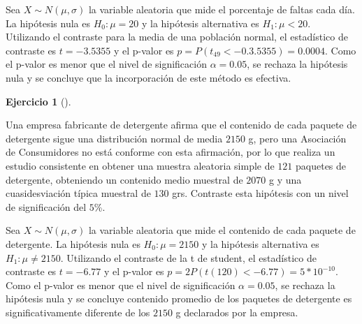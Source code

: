 \documentclass[
  spanish,
  a4paper,
]{scrreport}
\theoremstyle{definition}
\newtheorem{exercise}{Ejercicio}[chapter]
\theoremstyle{remark}
\begin{document}
\begin{tcolorbox}[enhanced jigsaw, arc=.35mm, bottomrule=.15mm, bottomtitle=1mm, breakable, colback=white, colbacktitle=quarto-callout-tip-color!10!white, colframe=quarto-callout-tip-color-frame, coltitle=black, left=2mm, leftrule=.75mm, opacityback=0, opacitybacktitle=0.6, rightrule=.15mm, title=\textcolor{quarto-callout-tip-color}{\faLightbulb}\hspace{0.5em}{Solución}, titlerule=0mm, toprule=.15mm, toptitle=1mm]

Sea \(X\sim N(\mu,\sigma)\) la variable aleatoria que mide el porcentaje
de faltas cada día. La hipótesis nula es \(H_0: \mu=20\) y la hipótesis
alternativa es \(H_1: \mu<20\). Utilizando el contraste para la media de
una población normal, el estadístico de contraste es \(t=-3.5355\) y el
p-valor es \(p =P(t_{49}<-0.3.5355) = 0.0004\). Como el p-valor es menor
que el nivel de significación \(\alpha = 0.05\), se rechaza la hipótesis
nula y se concluye que la incorporación de este método es efectiva.

\end{tcolorbox}

\begin{exercise}[]\protect\hypertarget{exr-contraste-media-detergente}{}\label{exr-contraste-media-detergente}

Una empresa fabricante de detergente afirma que el contenido de cada
paquete de detergente sigue una distribución normal de media \(2150\) g,
pero una Asociación de Consumidores no está conforme con esta
afirmación, por lo que realiza un estudio consistente en obtener una
muestra aleatoria simple de \(121\) paquetes de detergente, obteniendo
un contenido medio muestral de \(2070\) g y una cuasidesviación típica
muestral de \(130\) grs. Contraste esta hipótesis con un nivel de
significación del \(5\)\%.

\end{exercise}

\begin{tcolorbox}[enhanced jigsaw, arc=.35mm, bottomrule=.15mm, bottomtitle=1mm, breakable, colback=white, colbacktitle=quarto-callout-tip-color!10!white, colframe=quarto-callout-tip-color-frame, coltitle=black, left=2mm, leftrule=.75mm, opacityback=0, opacitybacktitle=0.6, rightrule=.15mm, title=\textcolor{quarto-callout-tip-color}{\faLightbulb}\hspace{0.5em}{Solución}, titlerule=0mm, toprule=.15mm, toptitle=1mm]

Sea \(X\sim N(\mu,\sigma)\) la variable aleatoria que mide el contenido
de cada paquete de detergente. La hipótesis nula es \(H_0: \mu=2150\) y
la hipótesis alternativa es \(H_1: \mu\neq 2150\). Utilizando el
contraste de la t de student, el estadístico de contraste es \(t=-6.77\)
y el p-valor es \(p =2 P(t(120)<-6.77) = 5*10^{-10}\). Como el p-valor
es menor que el nivel de significación \(\alpha = 0.05\), se rechaza la
hipótesis nula y se concluye contenido promedio de los paquetes de
detergente es significativamente diferente de los \(2150\) g declarados
por la empresa.

\end{tcolorbox}
\end{document}
